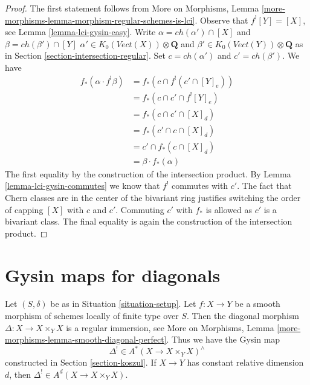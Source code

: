 \begin{proof}
The first statement follows from
More on Morphisms, Lemma
\ref{more-morphisms-lemma-morphism-regular-schemes-is-lci}.
Observe that $f^![Y] = [X]$, see Lemma \ref{lemma-lci-gysin-easy}.
Write $\alpha = ch(\alpha') \cap [X]$ and $\beta = ch(\beta') \cap [Y]$
$\alpha' \in K_0(\textit{Vect}(X)) \otimes \mathbf{Q}$ and
$\beta' \in K_0(\textit{Vect}(Y)) \otimes \mathbf{Q}$
as in Section \ref{section-intersection-regular}.
Set $c = ch(\alpha')$ and $c' = ch(\beta')$. We have
\begin{align*}
f_*(\alpha \cdot f^!\beta)
& =
f_*(c \cap f^!(c' \cap [Y]_e)) \\
& =
f_*(c \cap c' \cap f^![Y]_e) \\
& =
f_*(c \cap c' \cap [X]_d) \\
& =
f_*(c' \cap c \cap [X]_d) \\
& =
c' \cap f_*(c \cap [X]_d) \\
& =
\beta \cdot f_*(\alpha)
\end{align*}
The first equality by the construction of the intersection product.
By Lemma \ref{lemma-lci-gysin-commutes} we know that $f^!$
commutes with $c'$. The fact that Chern classes are in the center
of the bivariant ring justifies switching the order of capping
$[X]$ with $c$ and $c'$. Commuting $c'$ with $f_*$ is allowed as $c'$
is a bivariant class. The final equality is again the construction
of the intersection product.
\end{proof}













\section{Gysin maps for diagonals}
\label{section-gysin-for-diagonal}

\noindent
Let $(S, \delta)$ be as in Situation \ref{situation-setup}. Let $f : X \to Y$
be a smooth morphism of schemes locally of finite type over $S$. Then the
diagonal morphism $\Delta : X \longrightarrow X \times_Y X$
is a regular immersion, see
More on Morphisms, Lemma \ref{more-morphisms-lemma-smooth-diagonal-perfect}.
Thus we have the Gysin map
$$
\Delta^! \in A^*(X \to X \times_Y X)^\wedge
$$
constructed in Section \ref{section-koszul}. If $X \to Y$ has constant
relative dimension $d$, then $\Delta^! \in A^d(X \to X \times_Y X)$.

